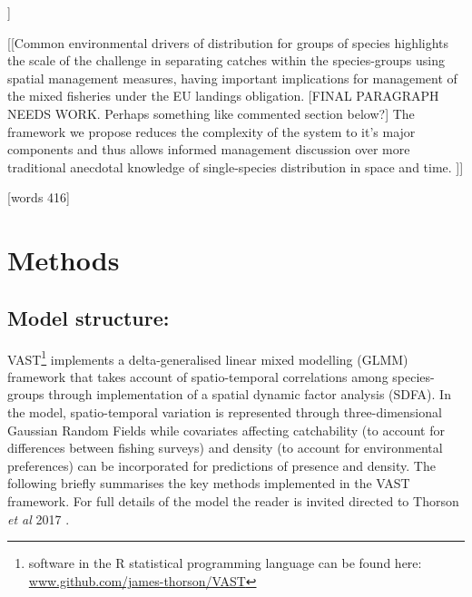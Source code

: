 \documentclass{nature}
\begin{document}
\begin{linenumbers}
[[Figure 5 shows the joint production function for the entire spatial domain,
giving the global production sets for the years 2011 - 2015. It gives the space
in which vessels have to operate where they can change the relative composition
of each species in the catch as a function of changing location fished only.
The convex hull of the space is the flexibility vessels have in order to adapt
to the changing fishing opportunities given the association of species with
each other\cite{Reimer2017}. As can be seen from Figure 5a which shows the
trade-off between cod and haddock for an Otter trawler....]]

[[Common environmental drivers of distribution for groups of species highlights
the scale of the challenge in separating catches within the species-groups
using spatial management measures, having important implications for management
of the mixed fisheries under the EU landings obligation. [FINAL PARAGRAPH NEEDS
WORK. Perhaps something like commented section below?] The framework we propose
reduces the complexity of the system to it's major components and thus allows
informed management discussion over more traditional anecdotal knowledge of
single-species distribution in space and time. ]]


[words 416]

\section*{Methods}

\subsection{Model structure:} 

VAST\footnote{software in the R statistical programming language can be found
	here: \url{www.github.com/james-thorson/VAST}} implements a
delta-generalised linear mixed modelling (GLMM) framework that takes account of
spatio-temporal correlations among species-groups through implementation of a
spatial dynamic factor analysis (SDFA).  In the model, spatio-temporal
variation is represented through three-dimensional Gaussian Random Fields while
covariates affecting catchability (to account for differences between fishing
surveys) and density (to account for environmental preferences) can be
incorporated for predictions of presence and density. The following briefly
summarises the key methods implemented in the VAST framework. For full details
of the model the reader is invited directed to Thorson \textit{et al} 2017
\cite{Thorson2017}.


\end{linenumbers}
\end{document}
